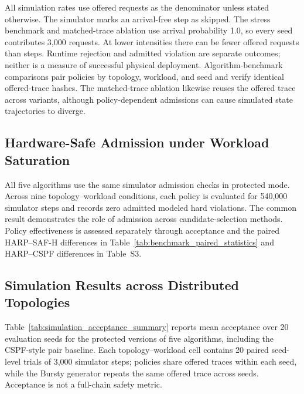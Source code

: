 \documentclass[final,5p]{elsarticle}
\newcommand{\rev}[1]{\textcolor{revisiongreen}{#1}}
\let\newrev\rev
\begin{document}
\newrev{All simulation rates use offered requests as the denominator unless stated otherwise. The simulator marks an arrival-free step as skipped. The stress benchmark and matched-trace ablation use arrival probability 1.0, so every seed contributes 3,000 requests. At lower intensities there can be fewer offered requests than steps. Runtime rejection and admitted violation are separate outcomes; neither is a measure of successful physical deployment. Algorithm-benchmark comparisons pair policies by topology, workload, and seed and verify identical offered-trace hashes. The matched-trace ablation likewise reuses the offered trace across variants, although policy-dependent admissions can cause simulated state trajectories to diverge.}

\subsection{\newrev{Hardware-Safe Admission under Workload Saturation}}
\newrev{All five algorithms use the same simulator admission checks in protected mode. Across nine topology--workload conditions, each policy is evaluated for 540,000 simulator steps and records zero admitted modeled hard violations. The common result demonstrates the role of admission across candidate-selection methods. Policy effectiveness is assessed separately through acceptance and the paired HARP--SAF-H differences in Table~\ref{tab:benchmark_paired_statistics} and HARP--CSPF differences in Table~S3.}



\subsection{\newrev{Simulation Results across Distributed Topologies}}
\label{subsec:simulation_results}
\newrev{Table~\ref{tab:simulation_acceptance_summary} reports mean acceptance over 20 evaluation seeds for the protected versions of five algorithms, including the CSPF-style pair baseline. Each topology--workload cell contains 20 paired seed-level trials of 3,000 simulator steps; policies share offered traces within each seed, while the Bursty generator repeats the same offered trace across seeds. Acceptance is not a full-chain safety metric.}
\end{document}
